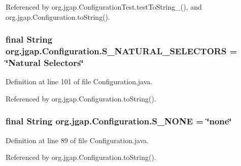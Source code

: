 Referenced by org.\-jgap.\-Configuration\-Test.\-test\-To\-String\-\_(), and org.\-jgap.\-Configuration.\-to\-String().

\hypertarget{classorg_1_1jgap_1_1_configuration_ac91782f7ad308a5b41526383d1746a18}{
\subsubsection[{S\-\_\-\-N\-A\-T\-U\-R\-A\-L\-\_\-\-S\-E\-L\-E\-C\-T\-O\-R\-S}]{\setlength{\rightskip}{0pt plus 5cm}final String org.\-jgap.\-Configuration.\-S\-\_\-\-N\-A\-T\-U\-R\-A\-L\-\_\-\-S\-E\-L\-E\-C\-T\-O\-R\-S = \char`\"{}Natural Selectors\char`\"{}\hspace{0.3cm}{\ttfamily [static]}}}\label{classorg_1_1jgap_1_1_configuration_ac91782f7ad308a5b41526383d1746a18}


Definition at line 101 of file Configuration.\-java.



Referenced by org.\-jgap.\-Configuration.\-to\-String().

\hypertarget{classorg_1_1jgap_1_1_configuration_a546ab1eed8429a6bdcdfcfceb6e4d342}{
\subsubsection[{S\-\_\-\-N\-O\-N\-E}]{\setlength{\rightskip}{0pt plus 5cm}final String org.\-jgap.\-Configuration.\-S\-\_\-\-N\-O\-N\-E = \char`\"{}none\char`\"{}\hspace{0.3cm}{\ttfamily [static]}}}\label{classorg_1_1jgap_1_1_configuration_a546ab1eed8429a6bdcdfcfceb6e4d342}


Definition at line 89 of file Configuration.\-java.



Referenced by org.\-jgap.\-Configuration.\-to\-String().

